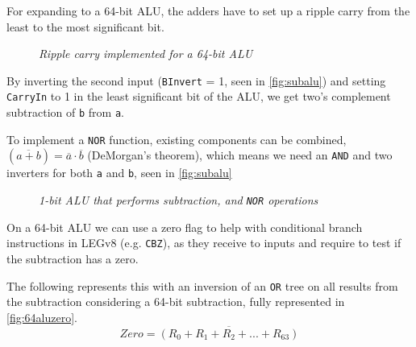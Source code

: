 \documentclass[11pt]{article}
\begin{document}
For expanding to a 64-bit ALU, the adders have to set up a ripple carry from the least to the most significant bit.

\begin{figure}[htbp]
    \centering
    \caption{\textit{Ripple carry implemented for a 64-bit ALU}}
\end{figure}

By inverting the second input (\texttt{BInvert} = 1, seen in \autoref{fig:subalu}) and setting \texttt{CarryIn} to 1 in the least significant bit of the ALU, we get two’s complement subtraction of \texttt{b} from \texttt{a}.

To implement a \texttt{NOR} function, existing components can be combined, $(\overline{a+b})=\overline{a} \cdot \overline{b}$ (DeMorgan's theorem), which means we need an \texttt{AND} and two inverters for both \texttt{a} and \texttt{b}, seen in \autoref{fig:subalu}

\begin{figure}[htbp]
    \centering
    \caption{\textit{1-bit ALU that performs subtraction, and \texttt{NOR} operations}}
    \label{fig:subalu}
\end{figure}

On a 64-bit ALU we can use a zero flag \label{jmp:zero-flag} to help with conditional branch instructions in LEGv8 (e.g. \texttt{CBZ}), as they receive to inputs and require to test if the subtraction has a zero.

The following represents this with an inversion of an \texttt{OR} tree on all results from the subtraction considering a 64-bit subtraction, fully represented in \autoref{fig:64aluzero}.
\vspace{-1em}
$$Zero = \overline{(R_0 + R_1 + R_2 + ... + R_{63})}$$
\vspace{-3em}
\end{document}
